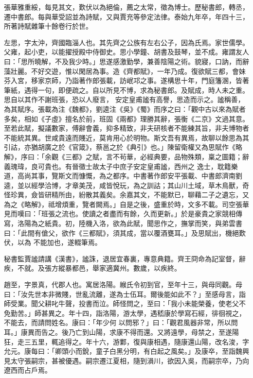 \begin{pinyinscope}
 張華雅重綏，每見其文，歎伏以為絕倫，薦之太常，徵為博士。歷秘書郎，轉丞，遷中書郎。每與華受詔並為詩賦，又與賈充等參定法律。泰始九年卒，年四十三，所著詩賦雜筆十餘卷行於世。



 左思，字太沖，齊國臨淄人也。其先齊之公族有左右公子，因為氏焉。家世儒學。父雍，起小吏，以能擢授殿中侍御史。思小學鐘、胡書及鼓琴，並不成。雍謂友人曰：「思所曉解，不及我少時。」思遂感激勤學，兼善陰陽之術。貌寢，口訥，而辭藻壯麗。不好交遊，惟以閑居為事。造《齊都賦》，一年乃成。復欲賦三都，會妹芬入宮，移家京師，乃詣著作郎張載，訪岷邛之事。遂構思十年，門庭籓溷，皆著筆紙，遇得一句，即便疏之。自以所見不博，求為秘書郎。及賦成，時人未之重。思自以其作不謝班張，恐以人廢言，
 安定皇甫謐有高譽，思造而示之。謐稱善，為其賦序。張載為注《魏都》，劉逵注《吳》《蜀》而序之曰：「觀中古以來為賦者多矣，相如《子虛》擅名於前，班固《兩都》理勝其辭，張衡《二京》文過其意。至若此賦，擬議數家，傅辭會義，抑多精致，非夫研核者不能練其旨，非夫博物者不能統其異。世咸貴遠而賤近，莫肯用心於明物。斯文吾有異焉，故聊以餘思為其引詁，亦猶胡廣之於《官箴》，蔡邕之於《典引》也。」陳留衛權又為思賦作《略解》，序曰：「余觀《三都》之賦，言不茍華，必經典要，品物殊類，稟之圖籍；辭義瑰瑋，良可貴也。有晉徵士故太子中庶子安定皇甫謐，西州之
 逸士，耽籍樂道，高尚其事，覽斯文而慷慨，為之都序。中書著作郎安平張載、中書郎濟南劉逵，並以經學洽博，才章美茂，咸皆悅玩，為之訓詁；其山川土域，草木鳥獸，奇怪珍異，僉皆研精所由，紛散其義矣。余嘉其文，不能默已，聊藉二子之遺忘，又為之《略解》，祗增煩重，覽者闕焉。」自是之後，盛重於時，文多不載。司空張華見而嘆曰：「班張之流也。使讀之者盡而有餘，久而更新。」於是豪貴之家競相傳寫，洛陽為之紙貴。初，陸機入洛，欲為此賦，聞思作之，撫掌而笑，與弟雲書曰：「此間有傖父，欲作《三都賦》，須其成，當以覆酒甕耳。」及思賦出，機絕歎伏，以為
 不能加也，遂輟筆焉。



 秘書監賈謐請講《漢書》，謐誅，退居宜春裏，專意典籍。齊王冏命為記室督，辭疾，不就。及張方縱暴都邑，舉家適冀州。數歲，以疾終。



 趙至，字景真，代郡人也。寓居洛陽。緱氏令初到官，至年十三，與母同觀。母曰：「汝先世本非微賤，世亂流離，遂為士伍耳。爾後能如此不？」至感母言，詣師受業。聞父耕叱牛聲，投書而泣。師怪問之，至曰：「我小未能榮養，使老父不免勤苦。」師甚異之。年十四，詣洛陽，游太學，遇嵇康於學寫石經，徘徊視之，不能去，而請問姓名。康曰：「年少何
 以問邪？」曰：「觀君風器非常，所以問耳。」康異而告之。後乃亡到山陽，求康不得而還。又將遠學，母禁之，至遂陽狂，走三五里，輒追得之。年十六，游鄴，復與康相遇，隨康還山陽，改名浚，字允元。康每曰：「卿頭小而銳，童子白黑分明，有白起之風矣。」及康卒，至詣魏興見太守張嗣宗，甚被優遇。嗣宗遷江夏相，隨到溳川，欲因入吳，而嗣宗卒，乃向遼西而占戶焉。




\end{pinyinscope}
